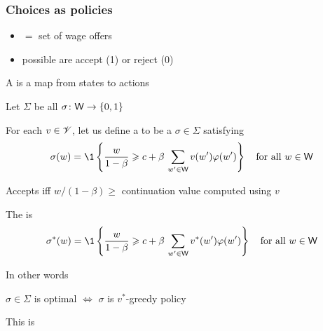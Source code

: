 \begin{frame}
    \frametitle{Choices as policies}
    
    \begin{itemize}
        \item {} $=$ set of wage offers 
        \item possible  are accept (1) or reject (0)
    \end{itemize}

    A  is a map from states to actions

    Let $\Sigma$ be all $\sigma \colon \mathsf W \to \{0, 1\}$

    For each $v \in \mathscr V$, let us define a  to be a $\sigma \in \Sigma$ satisfying
    \begin{equation*}
        \sigma(w) 
        = \1
        \left\{
            \frac{w}{1-\beta}
            \geq
            c + \beta \, \sum_{w' \in \Wsf} v(w') \phi(w')
        \right\}
        \quad \text{for all } w \in \Wsf
    \end{equation*}

    Accepts iff $w/(1-\beta) \geq$ continuation value computed
    using $v$ 

\end{frame}


\begin{frame}
    

    The  is
    \begin{equation*}
        \sigma^*(w) 
        = \1
        \left\{
            \frac{w}{1-\beta}
            \geq
            c + \beta \, \sum_{w' \in \Wsf} v^*(w') \phi(w')
        \right\}
        \quad \text{for all } w \in \Wsf
    \end{equation*}

    In other words
    \begin{center}
        $\sigma \in \Sigma$ is optimal
        $\iff$
        $\sigma$ is $v^*$-greedy policy
    \end{center}

            \vspace{0.5em}
    This is 


\end{frame}


